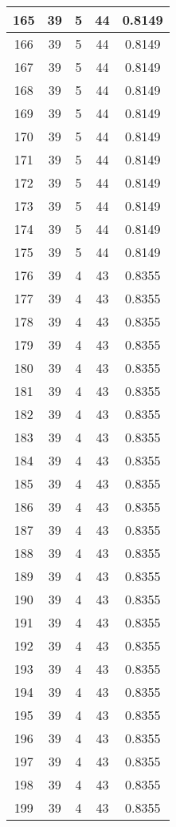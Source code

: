 \documentclass[letterpaper, 12pt]{article}
\begin{document}
\begin{longtable}{|c|c|c|c|c|}
\hline
165 & 39 & 5 & 44 & 0.8149 \\
\hline
166 & 39 & 5 & 44 & 0.8149 \\
\hline
167 & 39 & 5 & 44 & 0.8149 \\
\hline
168 & 39 & 5 & 44 & 0.8149 \\
\hline
169 & 39 & 5 & 44 & 0.8149 \\
\hline
170 & 39 & 5 & 44 & 0.8149 \\
\hline
171 & 39 & 5 & 44 & 0.8149 \\
\hline
172 & 39 & 5 & 44 & 0.8149 \\
\hline
173 & 39 & 5 & 44 & 0.8149 \\
\hline
174 & 39 & 5 & 44 & 0.8149 \\
\hline
175 & 39 & 5 & 44 & 0.8149 \\
\hline
176 & 39 & 4 & 43 & 0.8355 \\
\hline
177 & 39 & 4 & 43 & 0.8355 \\
\hline
178 & 39 & 4 & 43 & 0.8355 \\
\hline
179 & 39 & 4 & 43 & 0.8355 \\
\hline
180 & 39 & 4 & 43 & 0.8355 \\
\hline
181 & 39 & 4 & 43 & 0.8355 \\
\hline
182 & 39 & 4 & 43 & 0.8355 \\
\hline
183 & 39 & 4 & 43 & 0.8355 \\
\hline
184 & 39 & 4 & 43 & 0.8355 \\
\hline
185 & 39 & 4 & 43 & 0.8355 \\
\hline
186 & 39 & 4 & 43 & 0.8355 \\
\hline
187 & 39 & 4 & 43 & 0.8355 \\
\hline
188 & 39 & 4 & 43 & 0.8355 \\
\hline
189 & 39 & 4 & 43 & 0.8355 \\
\hline
190 & 39 & 4 & 43 & 0.8355 \\
\hline
191 & 39 & 4 & 43 & 0.8355 \\
\hline
192 & 39 & 4 & 43 & 0.8355 \\
\hline
193 & 39 & 4 & 43 & 0.8355 \\
\hline
194 & 39 & 4 & 43 & 0.8355 \\
\hline
195 & 39 & 4 & 43 & 0.8355 \\
\hline
196 & 39 & 4 & 43 & 0.8355 \\
\hline
197 & 39 & 4 & 43 & 0.8355 \\
\hline
198 & 39 & 4 & 43 & 0.8355 \\
\hline
199 & 39 & 4 & 43 & 0.8355 \\
\hline
\end{longtable}
\end{document}
